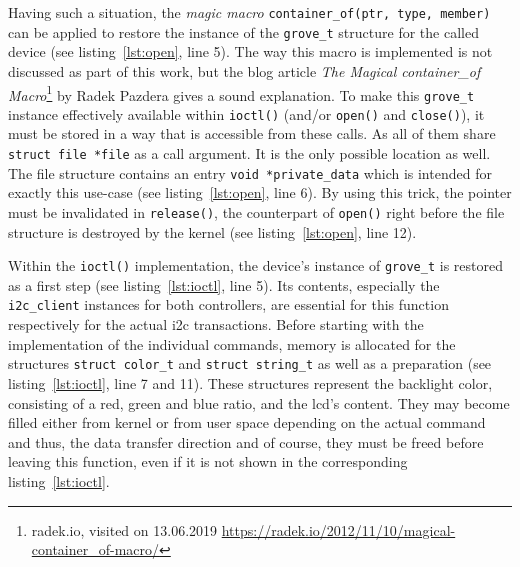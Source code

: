 %
Having such a situation, the \textit{magic macro} \texttt{container\_of(ptr, type, member)} can be applied to restore the instance of the \texttt{grove\_t} structure for the called device (see listing~\ref{lst:open}, line 5).
The way this macro is implemented is not discussed as part of this work, but the blog article \textit{The Magical container\_of Macro}\footnote{radek.io, visited on 13.06.2019 \url{https://radek.io/2012/11/10/magical-container_of-macro/}} by Radek Pazdera gives a sound explanation.
To make this \texttt{grove\_t} instance effectively available within \texttt{ioctl()} (and/or \texttt{open()} and \texttt{close()}), it must be stored in a way that is accessible from these calls.
As all of them share \texttt{struct file *file} as a call argument.
It is the only possible location as well.
The file structure contains an entry \texttt{void *private_data} which is intended for exactly this use-case (see listing~\ref{lst:open}, line 6). 
By using this trick, the pointer must be invalidated in \texttt{release()}, the counterpart of \texttt{open()} right before the file structure is destroyed by the kernel (see listing~\ref{lst:open}, line 12).

Within the \texttt{ioctl()} implementation, the device's instance of \texttt{grove_t} is restored as a first step (see listing~\ref{lst:ioctl}, line 5).
Its contents, especially the \texttt{i2c_client} instances for both controllers, are essential for this function respectively for the actual \ac{i2c} transactions.
Before starting with the implementation of the individual commands, memory is allocated for the structures \texttt{struct color_t} and \texttt{struct string_t} as well as a preparation (see listing~\ref{lst:ioctl}, line 7 and 11).
These structures represent the backlight color, consisting of a red, green and blue ratio, and the \ac{lcd}'s content.
They may become filled either from kernel or from user space depending on the actual command and thus, the data transfer direction and of course, they must be freed before leaving this function, even if it is not shown in the corresponding listing~\ref{lst:ioctl}.

